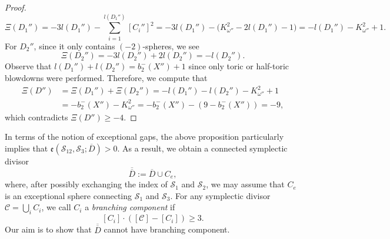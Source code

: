 \documentclass[11pt]{article}
\theoremstyle{definition}
\theoremstyle{remark}
\newcommand{\st}{\mathcal{S}}
\begin{document}
\begin{proof}
\[\Xi(D_1'')=-3l(D_1'')-\sum_{i=1}^{l(D_1'')} [C_i'']^2=-3l(D_1'')-\big(K_{\omega''}^2-2l(D_1'')-1\big)=-l(D_1'')-K_{\omega''}^2+1.\]
For $D_2''$, since it only contains $(-2)$-spheres, we see 
\[\Xi(D_2'')=-3l(D_2'')+2l(D_2'')=-l(D_2'').\]
 Observe that $l(D_1'')+l(D_2'')=b_2^-(X'')+1$ since only toric or half-toric blowdowns were performed. Therefore, we compute that 
\begin{align*}
\Xi(D'')&=\Xi(D_1'')+\Xi(D_2'')=-l(D_1'')-l(D_2'')-K_{\omega''}^2+1\\
&=-b_2^-(X'')-K_{\omega''}^2=-b_2^-(X'')-(9-b_2^-(X''))=-9,
\end{align*}
which contradicts $\Xi(D'')\geq -4$.
\end{proof}

In terms of the notion of exceptional gaps, the above proposition particularly implies that $\mathfrak{e}(\st_{12},\st_3;\overline{D})>0$. As a result, we obtain a connected symplectic divisor
\[\overline{\overline{D}}:=\overline{D}\cup C_e,\]
where, after possibly exchanging the index of $\st_1$ and $\st_2$, we may assume that $C_e$ is an exceptional sphere connecting $\st_1$ and $\st_3$. For any symplectic divisor $\mathcal{C}=\bigcup_i C_i$, we call $C_i$ a \emph{branching component} if
\[
[C_i]\cdot([\mathcal{C}]-[C_i])\geq 3.
\]
Our aim is to show that $\overline{\overline{D}}$ cannot have branching component.
\end{document}
